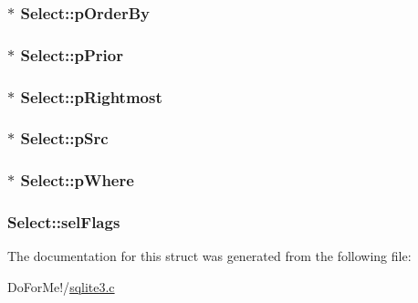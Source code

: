 \hypertarget{struct_select_a73c474cd4a9a9b9aa4e3187d8bf2d886}{
\subsubsection[{p\-Order\-By}]{$\ast$ Select\-::p\-Order\-By}}\label{struct_select_a73c474cd4a9a9b9aa4e3187d8bf2d886}
\hypertarget{struct_select_a51d1a253b0aba5a54b11b3bf3896d056}{
\subsubsection[{p\-Prior}]{$\ast$ Select\-::p\-Prior}}\label{struct_select_a51d1a253b0aba5a54b11b3bf3896d056}
\hypertarget{struct_select_a6ee045fa4305f1d68be5bdc22555e624}{
\subsubsection[{p\-Rightmost}]{$\ast$ Select\-::p\-Rightmost}}\label{struct_select_a6ee045fa4305f1d68be5bdc22555e624}
\hypertarget{struct_select_a4e3b9b176a8e1b4af988405ff1f090db}{
\subsubsection[{p\-Src}]{$\ast$ Select\-::p\-Src}}\label{struct_select_a4e3b9b176a8e1b4af988405ff1f090db}
\hypertarget{struct_select_a0562c1e19acde263a04af015611d8ce8}{
\subsubsection[{p\-Where}]{$\ast$ Select\-::p\-Where}}\label{struct_select_a0562c1e19acde263a04af015611d8ce8}
\hypertarget{struct_select_a1c445561ea66d48573c8d8751108c743}{
\subsubsection[{sel\-Flags}]{ Select\-::sel\-Flags}}\label{struct_select_a1c445561ea66d48573c8d8751108c743}


The documentation for this struct was generated from the following file\-:\begin{DoxyCompactItemize}
\item 
Do\-For\-Me!/\hyperlink{sqlite3_8c}{sqlite3.\-c}\end{DoxyCompactItemize}
